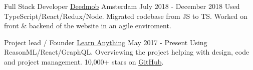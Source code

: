 
\begin{cventries}

  \cventry
    {Full Stack Developer} %
    {\href{https://www.deedmob.com}{Deedmob}} %
    {Amsterdam} %
    {July 2018 - December 2018} %
    {
      {Used TypeScript/React/Redux/Node. Migrated codebase from JS to TS. Worked on front \& backend of the website in an agile enviroment.}
    }

  \cventry
    {Project lead / Founder} %
    {\href{https://learn-anything.xyz}{Learn Anything}} %
    {} %
    {May 2017 - Present} %
    {
      {Using ReasonML/React/GraphQL. Overviewing the project helping with design, code and project management. 10,000+ stars on \href{https://github.com/learn-anything/learn-anything}{GitHub}.}
    }

\end{cventries}

